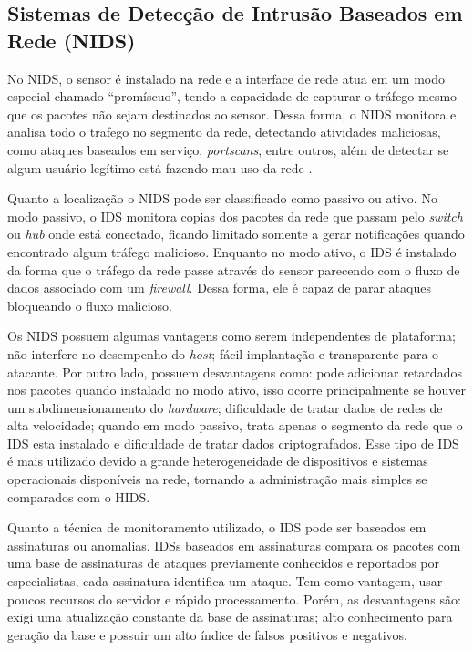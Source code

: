 \subsection{Sistemas de Detecção de Intrusão Baseados em Rede (NIDS)}

No NIDS, o sensor é instalado na rede e a interface de rede atua em um modo especial chamado ``promíscuo'', tendo a capacidade de capturar o tráfego mesmo que os pacotes não sejam destinados ao sensor. Dessa forma, o NIDS monitora e analisa todo o trafego no segmento da rede, detectando atividades maliciosas, como ataques baseados em serviço, \textit{portscans}, entre outros, além de detectar se algum usuário legítimo está fazendo mau uso da rede \cite{}.

Quanto a localização o NIDS pode ser classificado como passivo ou ativo. No modo passivo, o IDS monitora copias dos pacotes da rede que passam pelo \textit{switch} ou \textit{hub} onde está conectado, ficando limitado somente a gerar notificações quando encontrado algum tráfego malicioso. Enquanto no modo ativo, o IDS é instalado da forma que o tráfego da rede passe através do sensor parecendo com o fluxo de dados associado com um \textit{firewall}. Dessa forma, ele é capaz de parar ataques bloqueando o fluxo malicioso. 

Os NIDS possuem algumas vantagens como serem independentes de plataforma; não interfere no desempenho do \textit{host}; fácil implantação e transparente para o atacante. Por outro lado, possuem desvantagens como: pode adicionar retardados nos pacotes quando instalado no modo ativo, isso ocorre principalmente se houver um subdimensionamento do \textit{hardware}; dificuldade de tratar dados de redes de alta velocidade; quando em modo passivo, trata apenas o segmento da rede que o IDS esta instalado e dificuldade de tratar dados criptografados. Esse tipo de IDS é mais utilizado devido a grande heterogeneidade de dispositivos e sistemas operacionais disponíveis na rede, tornando a administração mais simples se comparados com o HIDS.

 Quanto a técnica de monitoramento utilizado, o IDS pode ser baseados em assinaturas ou anomalias. IDSs baseados em assinaturas compara os pacotes com uma base de assinaturas de ataques previamente conhecidos e reportados por especialistas, cada assinatura identifica um ataque. Tem como vantagem, usar poucos recursos do servidor e rápido processamento. Porém, as desvantagens são: exigi uma atualização constante da base de assinaturas; alto conhecimento para geração da base e possuir um alto índice de falsos positivos e negativos.

